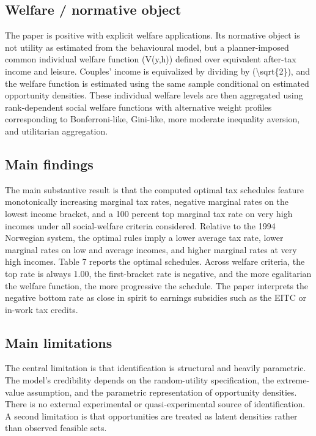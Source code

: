 \documentclass[11pt,a4paper]{article}
\begin{document}
\subsection*{Welfare / normative object}
The paper is positive with explicit welfare applications. Its normative object is not utility as estimated from the behavioural model, but a planner-imposed common individual welfare function (V(y,h)) defined over equivalent after-tax income and leisure. Couples’ income is equivalized by dividing by (\textbackslash{}sqrt\{2\}), and the welfare function is estimated using the same sample conditional on estimated opportunity densities. These individual welfare levels are then aggregated using rank-dependent social welfare functions with alternative weight profiles corresponding to Bonferroni-like, Gini-like, more moderate inequality aversion, and utilitarian aggregation.

\subsection*{Main findings}
The main substantive result is that the computed optimal tax schedules feature monotonically increasing marginal tax rates, negative marginal rates on the lowest income bracket, and a 100 percent top marginal tax rate on very high incomes under all social-welfare criteria considered. Relative to the 1994 Norwegian system, the optimal rules imply a lower average tax rate, lower marginal rates on low and average incomes, and higher marginal rates at very high incomes. Table 7 reports the optimal schedules. Across welfare criteria, the top rate is always 1.00, the first-bracket rate is negative, and the more egalitarian the welfare function, the more progressive the schedule. The paper interprets the negative bottom rate as close in spirit to earnings subsidies such as the EITC or in-work tax credits.

\subsection*{Main limitations}
The central limitation is that identification is structural and heavily parametric. The model’s credibility depends on the random-utility specification, the extreme-value assumption, and the parametric representation of opportunity densities. There is no external experimental or quasi-experimental source of identification. A second limitation is that opportunities are treated as latent densities rather than observed feasible sets.
\end{document}
